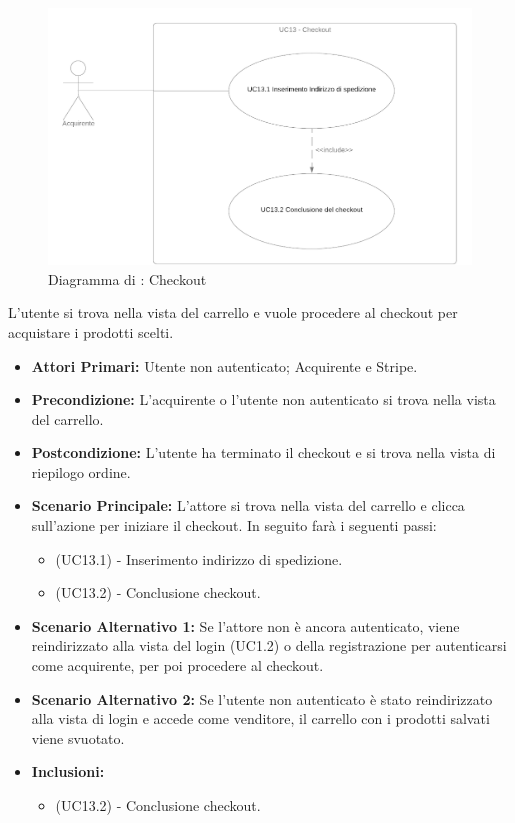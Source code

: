 \begin{figure}[H]
    \centering
    \includegraphics[scale=0.4]{Immagini/DiagrammiUC/UC13Checkout.png}
    \caption{Diagramma di \actualUC: Checkout} 
    \label{fig:Checkout}
\end{figure}

L'utente si trova nella vista del carrello e vuole procedere al checkout per acquistare i prodotti scelti.
\begin{itemize}
    \item \textbf{Attori Primari:} Utente non autenticato; Acquirente e Stripe.
    \item \textbf{Precondizione:} L'acquirente o l'utente non autenticato si trova nella vista del carrello.
    \item \textbf{Postcondizione:} L'utente ha terminato il checkout e si trova nella vista di riepilogo ordine.
    \item \textbf{Scenario Principale:} L'attore si trova nella vista del carrello e clicca sull'azione per iniziare il checkout. In seguito farà i seguenti passi:
    \begin{itemize}
        \item (UC13.1) - Inserimento indirizzo di spedizione.
        \item (UC13.2) - Conclusione checkout.
    \end{itemize}
    \item \textbf{Scenario Alternativo 1:} Se l'attore non è ancora autenticato, viene reindirizzato alla vista del login (UC1.2) o della registrazione per autenticarsi come acquirente, per poi procedere al checkout.
    \item \textbf{Scenario Alternativo 2:} Se l'utente non autenticato è stato reindirizzato alla vista di login e accede come venditore, il carrello con i prodotti salvati viene svuotato.
    \item \textbf{Inclusioni:}
    \begin{itemize}
        \item (UC13.2) - Conclusione checkout.
    \end{itemize}
\end{itemize}

